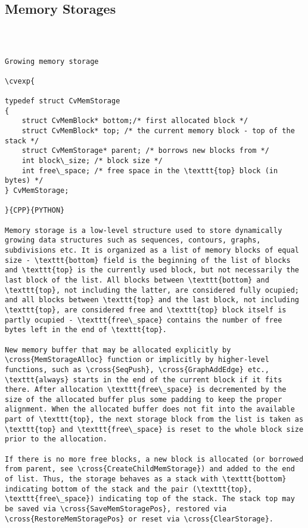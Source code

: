 \subsection{Memory Storages}
\begin{verbatim}


\end{verbatim}
\begin{verbatim}

Growing memory storage

\cvexp{

typedef struct CvMemStorage
{
    struct CvMemBlock* bottom;/* first allocated block */
    struct CvMemBlock* top; /* the current memory block - top of the stack */
    struct CvMemStorage* parent; /* borrows new blocks from */
    int block\_size; /* block size */
    int free\_space; /* free space in the \texttt{top} block (in bytes) */
} CvMemStorage;

}{CPP}{PYTHON}

Memory storage is a low-level structure used to store dynamically growing data structures such as sequences, contours, graphs, subdivisions etc. It is organized as a list of memory blocks of equal size - \texttt{bottom} field is the beginning of the list of blocks and \texttt{top} is the currently used block, but not necessarily the last block of the list. All blocks between \texttt{bottom} and \texttt{top}, not including the latter, are considered fully ocupied; and all blocks between \texttt{top} and the last block, not including \texttt{top}, are considered free and \texttt{top} block itself is partly ocupied - \texttt{free\_space} contains the number of free bytes left in the end of \texttt{top}.

New memory buffer that may be allocated explicitly by \cross{MemStorageAlloc} function or implicitly by higher-level functions, such as \cross{SeqPush}, \cross{GraphAddEdge} etc., \texttt{always} starts in the end of the current block if it fits there. After allocation \texttt{free\_space} is decremented by the size of the allocated buffer plus some padding to keep the proper alignment. When the allocated buffer does not fit into the available part of \texttt{top}, the next storage block from the list is taken as \texttt{top} and \texttt{free\_space} is reset to the whole block size prior to the allocation.

If there is no more free blocks, a new block is allocated (or borrowed from parent, see \cross{CreateChildMemStorage}) and added to the end of list. Thus, the storage behaves as a stack with \texttt{bottom} indicating bottom of the stack and the pair (\texttt{top}, \texttt{free\_space}) indicating top of the stack. The stack top may be saved via \cross{SaveMemStoragePos}, restored via \cross{RestoreMemStoragePos} or reset via \cross{ClearStorage}.


\end{verbatim}
